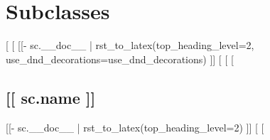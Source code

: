 
\section*{Subclasses}
[%
  [%
    \DndFeatHeader{[[ sc.name ]]} %
    [[- sc.__doc__ | rst_to_latex(top_heading_level=2, use_dnd_decorations=use_dnd_decorations) ]]
    [%
[%
    [%
    \subsection*{[[ sc.name ]]}
    [[- sc.__doc__ | rst_to_latex(top_heading_level=2) ]]
    [%
[%
